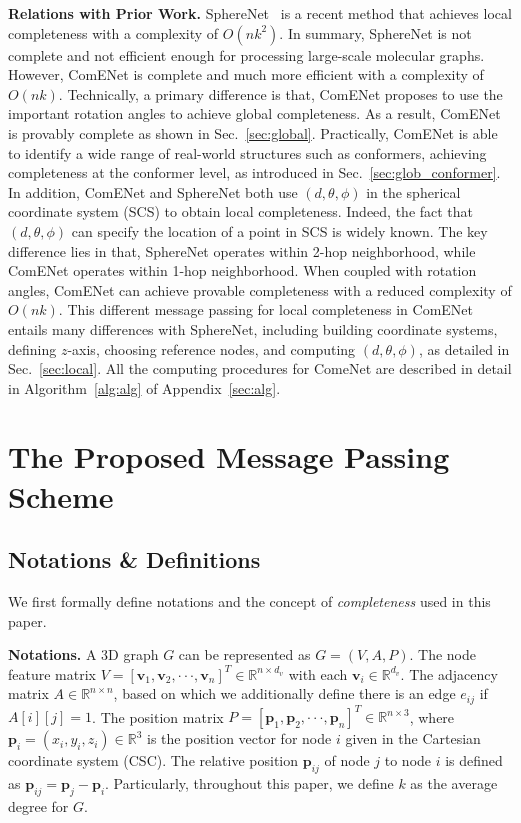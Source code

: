 \documentclass{article}
\begin{document}
\textbf{Relations with Prior Work.}
SphereNet~\citep{liu2022spherical} is a recent method that 
achieves local completeness with a complexity of $O(nk^2)$.
In summary, SphereNet is not complete and not efficient enough for processing large-scale molecular graphs.
However, ComENet is complete and much more efficient with a complexity of $O(nk)$.
Technically, a primary difference is that, ComENet
proposes to use the important rotation angles to achieve global
completeness.
As a result, ComENet is provably complete as shown in Sec.~\ref{sec:global}.
Practically, ComENet is able to identify a wide range of real-world
structures such as conformers, achieving completeness
at the conformer level,
as introduced in 
Sec.~\ref{sec:glob_conformer}.
In addition, ComENet and SphereNet both use $(d,\theta,\phi)$ in the spherical coordinate system (SCS) to obtain local completeness. 
Indeed, the fact that $(d,\theta,\phi)$ can specify the location of a point in SCS is widely known. The key difference lies in that, SphereNet
operates within 2-hop neighborhood, while ComENet operates within 1-hop neighborhood. When coupled with rotation angles, ComENet can achieve provable completeness with a reduced complexity of $O(nk)$.
This different message passing for local completeness in ComENet entails many differences with SphereNet, including building coordinate systems, defining $z$-axis, choosing reference nodes, and computing $(d,\theta,\phi)$,
as detailed in Sec.~\ref{sec:local}.
All the computing procedures for ComeNet are described in detail in Algorithm~\ref{alg:alg} of Appendix~\ref{sec:alg}.


\vspace{-5pt}
\section{The Proposed Message Passing Scheme}

\subsection{Notations \& Definitions} \label{sec:def}
We first formally define notations and the concept of \emph{completeness} used in this paper.

\textbf{Notations.}
A 3D graph $G$ can be represented as $G=(V, A, P)$.
The node feature matrix $V=[\textbf{v}_1, \textbf{v}_2,\cdot\cdot\cdot,\textbf{v}_n]^T \in \mathbb{R}^{n \times d_v}$
with each $\textbf{v}_i\in \mathbb{R}^{d_v}$.
The adjacency matrix $A\in \mathbb{R}^{n \times n}$,
based on which we additionally define there is an edge $e_{ij}$ if $A[i][j]=1$.
The position matrix $P=[\textbf{p}_1, \textbf{p}_2,\cdot\cdot\cdot,\textbf{p}_n]^T \in \mathbb{R}^{n \times 3}$,
where $\textbf{p}_i = (x_i, y_i, z_i)\in \mathbb{R}^{3}$ is the position vector for node $i$
given in the Cartesian coordinate system (CSC).
The relative position $\textbf{p}_{ij}$ of node $j$ to node $i$ is defined as
$\textbf{p}_{ij} = \textbf{p}_{j} - \textbf{p}_{i}$.
Particularly, throughout this paper, we define $k$ as the average degree
for $G$.
\end{document}
